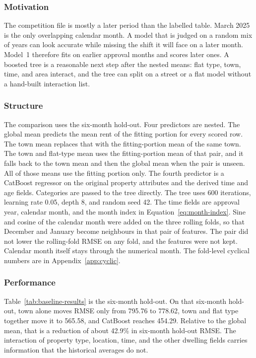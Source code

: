 \documentclass[11pt,a4paper]{article}
\begin{document}
\subsubsection{Motivation}

The competition file is mostly a later period than the labelled table.
March 2025 is the only overlapping calendar month.
A model that is judged on a random mix of years can look accurate while missing the shift it will face on a later month.
Model~1 therefore fits on earlier approval months and scores later ones.
A boosted tree is a reasonable next step after the nested means: flat type, town, time, and area interact, and the tree can split on a street or a flat model without a hand-built interaction list.

\subsubsection{Structure}

The comparison uses the six-month hold-out.
Four predictors are nested.
The global mean predicts the mean rent of the fitting portion for every scored row.
The town mean replaces that with the fitting-portion mean of the same town.
The town and flat-type mean uses the fitting-portion mean of that pair, and it falls back to the town mean and then the global mean when the pair is unseen.
All of those means use the fitting portion only.
The fourth predictor is a CatBoost regressor on the original property attributes and the derived time and age fields.
Categories are passed to the tree directly.
The tree uses 600 iterations, learning rate 0.05, depth 8, and random seed 42.
The time fields are approval year, calendar month, and the month index in Equation~\eqref{eq:month-index}.
Sine and cosine of the calendar month were added on the three rolling folds, so that December and January become neighbours in that pair of features.
The pair did not lower the rolling-fold RMSE on any fold, and the features were not kept.
Calendar month itself stays through the numerical month.
The fold-level cyclical numbers are in Appendix~\ref{app:cyclic}.

\subsubsection{Performance}

Table~\ref{tab:baseline-results} is the six-month hold-out.
On that six-month hold-out, town alone moves RMSE only from 795.76 to 778.62, town and flat type together move it to 565.58, and CatBoost reaches 454.29.
Relative to the global mean, that is a reduction of about 42.9\% in six-month hold-out RMSE.
The interaction of property type, location, time, and the other dwelling fields carries information that the historical averages do not.
\end{document}
